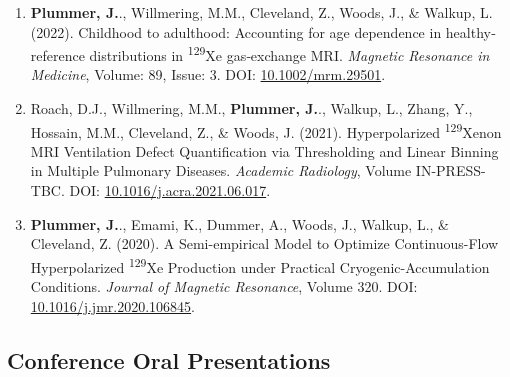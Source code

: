 \documentclass[12pt,]{scrartcl}
\begin{document}
\begin{enumerate}
  \leftskip-0.13in %
    \item \textbf{Plummer, J.}., Willmering, M.M., Cleveland, Z., Woods, J., \& Walkup, L. (2022). Childhood to adulthood: Accounting for age dependence in healthy‐reference distributions in \textsuperscript{129}Xe gas‐exchange MRI. \textit{Magnetic Resonance in Medicine}, Volume: 89, Issue: 3. DOI: \href{https://onlinelibrary.wiley.com/share/GVTXYDIF3Y2VPZRHQRIK?target=10.1002/mrm.29501}{10.1002/mrm.29501}.
    \item Roach, D.J., Willmering, M.M., \textbf{Plummer, J.}., Walkup, L., Zhang, Y., Hossain, M.M., Cleveland, Z., \& Woods, J. (2021). Hyperpolarized \textsuperscript{129}Xenon MRI Ventilation Defect Quantification via Thresholding and Linear Binning in Multiple Pulmonary Diseases. \textit{Academic Radiology}, Volume IN-PRESS-TBC. DOI: \href{https://doi.org/10.1016/j.acra.2021.06.017}{10.1016/j.acra.2021.06.017}.
  \item \textbf{Plummer, J.}., Emami, K., Dummer, A., Woods, J., Walkup, L., \& Cleveland, Z. (2020). A Semi-empirical Model to Optimize Continuous-Flow Hyperpolarized \textsuperscript{129}Xe Production under Practical Cryogenic-Accumulation Conditions. \textit{Journal of Magnetic Resonance}, Volume 320. DOI: \href{https://doi.org/10.1016/j.jmr.2020.106845}{10.1016/j.jmr.2020.106845}.

\end{enumerate}

\subsection{Conference Oral Presentations}\label{conferences_presentations}
\end{document}
